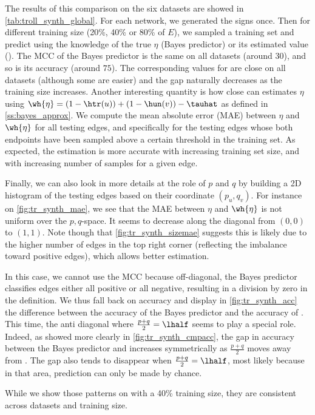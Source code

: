 \begin{newcontent}
The results of this comparison on the six datasets are showed in \autoref{tab:troll_synth_global}.
For each network, we generated the signs once. Then for different training size (20\%, 40\% or 80\%
of $E$), we sampled a training set and predict using the knowledge of the true $\eta$ (Bayes
predictor) or its estimated value (\usrule{}).
The MCC of the Bayes predictor is the same on all datasets (around $30$), and so is its accuracy
(around $75$). The corresponding values for \usrule{} are close on all datasets (although some are
easier) and the gap naturally decreases as the training size increases. Another interesting
quantity is how close can \usrule{} estimates $\eta$ using $\wh{\eta} = \left(1-\htr(u)\right) +
\left(1-\hun(v)\right) -\tauhat$ as defined in \autoref{ss:bayes_approx}. We compute the mean
absolute error (MAE) between $\eta$ and $\wh{\eta}$ for all testing edges, and specifically for
the testing edges whose both endpoints have been sampled above a certain threshold in the training
set. As expected, the estimation is more accurate with increasing training set size, and with
increasing number of samples for a given edge.



Finally, we can also look in more details at the role of $p$ and $q$ by building a 2D histogram of
the testing edges \euv{} based on their coordinate $(p_u, q_v)$. For instance on
\autoref{fig:tr_synth_mae}, we see that the MAE between $\eta$ and $\wh{\eta}$ is not uniform over
the $p,q$-space. It seems to decrease along the diagonal from $(0,0)$ to $(1,1)$. Note though that
\autoref{fig:tr_synth_sizemae} suggests this is likely due to the higher number of edges in the top
right corner (reflecting the imbalance toward positive edges), which allows better estimation. 

In this case, we cannot use the MCC because off-diagonal, the Bayes predictor classifies edges
either all positive or all negative, resulting in a division by zero in the definition. We thus
fall back on accuracy and display in \autoref{fig:tr_synth_acc} the difference between the accuracy
of the Bayes predictor and the accuracy of \usrule{}. This time, the anti diagonal where
$\frac{p+q}{2}=\lhalf$ seems to play a special role. Indeed, as showed more clearly in
\autoref{fig:tr_synth_cmpacc}, the gap in accuracy between the Bayes predictor and \usrule{}
increases symmetrically as $\frac{p+q}{2}$ moves away from \shalf{}. The gap also tends to disappear
when $\frac{p+q}{2}=\lhalf$, most likely because in that area, prediction can only be made by
chance. 

While we show those patterns on \wik{} with a 40\% training size, they are consistent across
datasets and training size.

\end{newcontent}

